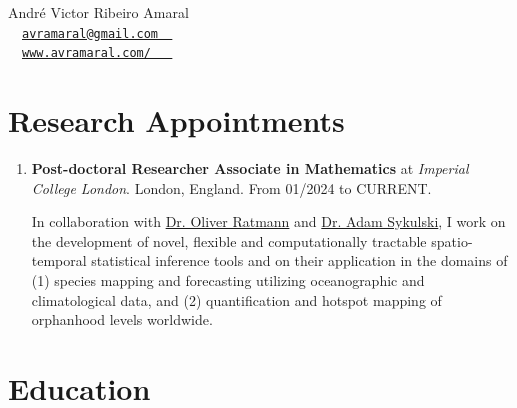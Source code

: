 \documentclass[10pt, ]{article}
\begin{document}
	
	\begin{center}
		{\LARGE André Victor Ribeiro Amaral} \\ \vspace{3pt}
		{\small\faEnvelope~~\href{mailto:avramaral@gmail.com}{\texttt{avramaral@gmail.com~~}}} \\
		{\small\faDesktop~~\href{https://www.avramaral.com/}{\texttt{www.avramaral.com/~~~}}}	%
	\end{center}
	
	\vspace{-12pt}
	\section*{Research Appointments} \vspace{-5pt}
	
	\begin{enumerate}[noitemsep, topsep=0pt]
		\item \textbf{Post-doctoral Researcher Associate in Mathematics} at \textit{Imperial College London}. London, England. From 01/2024 to CURRENT. \vspace{3pt}
		
		In collaboration with \href{https://www.imperial.ac.uk/people/oliver.ratmann05}{Dr. Oliver Ratmann} and \href{https://www.imperial.ac.uk/people/adam.sykulski}{Dr. Adam Sykulski}, I work on the development of novel, flexible and computationally tractable spatio-temporal statistical inference tools and on their application in the domains of (1) species mapping and forecasting utilizing oceanographic and climatological data, and (2) quantification and hotspot mapping of orphanhood levels worldwide.
		
	\end{enumerate}
	
	\vspace{10pt}
	
	\vspace{-12pt}
	\section*{Education} \vspace{-5pt}
	
\end{document}
